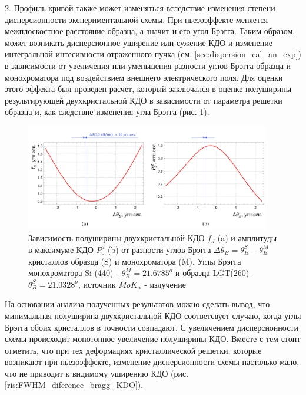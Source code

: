 2. Профиль кривой также может изменяться вследствие изменения степени
 дисперсионности экспериментальной схемы.
При пьезоэффекте меняется межплоскостное расстояние образца, а значит и его угол Брэгга.
Таким образом, может возникать дисперсионное уширение или сужение КДО и изменение интегральной интесивности
отраженного пучка (см. \ref{sec:dispersion_cal_an_exp}) в зависимости
от увеличения или уменьшения разности углов Брэгга образца и монохроматора
под воздействием внешнего электрического поля. Для оценки этого эффекта был
проведен расчет, который заключался в оценке полуширины результирующей двухкристальной КДО
в зависимости от параметра решетки образца и, как следствие
 изменения угла Брэгга (рис. \ref{ris:FWHM_diference_bragg}).
\begin{figure}[H]
  \centering
  \includegraphics[width=0.95\textwidth]{images/delta_bragg_dispers.png}
  \caption{Зависимость полуширины двухкристальной КДО $f_d$ (a) и амплитуды в максимуме КДО  $P^d_0$ (b)
   от разности углов Брэгга $\Delta\theta_B =\theta_B^S-\theta_B^M $ кристаллов
  образца (S) и монохроматора (M). Углы Брэгга монохроматора Si (440) - $\theta_B^M = 21.6785 ^o$ и
   образца LGT(260) - $\theta_B^S = 21.0328 ^o$, источник $MoK_{\alpha}$ - излучение}
  \label{ris:FWHM_diference_bragg}
\end{figure}

На основании анализа полученных результатов можно сделать вывод, что минимальная полуширина
двухкристальной КДО соответсвует случаю, когда углы Брэгга обоих кристаллов в точности совпадают. С увеличением
дисперсионности схемы происходит монотонное увеличение полуширины КДО. Вместе с тем стоит отметить,
что при тех деформациях кристаллической решетки, которые возникают при пьезоэффекте,
изменение дисперсионности схемы настолько мало, что не приводит к видимому уширению КДО (рис. \ref{ris:FWHM_diference_bragg_KDO}).

